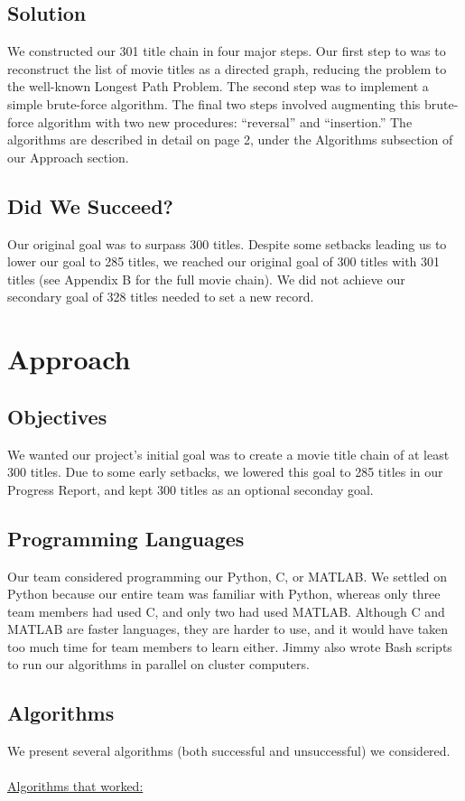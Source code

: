 \documentclass[11pt,english]{article}
\begin{document}
\subsection{Solution}
We constructed our 301 title chain in four major steps. Our first step to was to
reconstruct the list of movie titles as a directed graph, reducing the problem
to the well-known Longest Path Problem. The second step was to implement a
simple brute-force algorithm. The final two steps involved augmenting this
brute-force algorithm with two new procedures: ``reversal'' and ``insertion.''
The algorithms are described in detail on page 2, under the Algorithms
subsection of our Approach section.

\subsection{Did We Succeed?}
Our original goal was to surpass 300 titles. Despite some setbacks leading us
to lower our goal to 285 titles, we reached our original goal of 300 titles
with 301 titles (see Appendix B for the full movie chain). We did not
achieve our secondary goal of 328 titles needed to set a new record.

\section{Approach}

\subsection{Objectives}
We wanted our project's initial goal was to create a movie title chain of at
least 300 titles. Due to some early setbacks, we lowered this goal to 285
titles in our Progress Report, and kept 300 titles as an optional seconday
goal.

\subsection{Programming Languages}
Our team considered programming our Python, C, or MATLAB. We
settled on Python because our entire team was familiar with Python, whereas
only three team members had used C, and only two had used MATLAB. Although C
and MATLAB are faster languages, they are harder to use, and it would have
taken too much time for team members to learn either. Jimmy also wrote Bash
scripts to run our algorithms in parallel on cluster computers.

\subsection{Algorithms}
We present several algorithms (both successful and unsuccessful) we
considered.\\\\
\underline{Algorithms that worked:}
\end{document}
